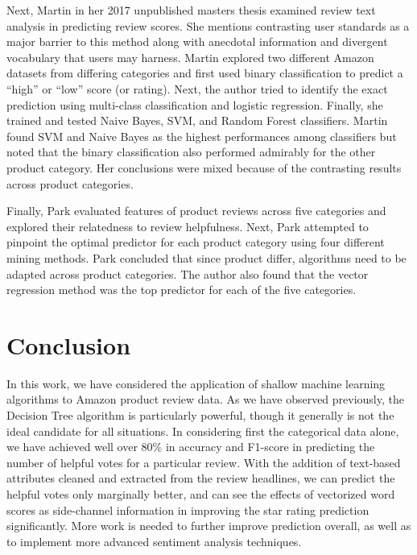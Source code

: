 \documentclass[10pt, conference, compsocconf]{IEEEtran}
\begin{document}
Next, Martin \cite{master} in her 2017 unpublished masters thesis examined review text analysis in predicting review scores. She mentions contrasting user standards as a major barrier to this method along with anecdotal information and divergent vocabulary that users may harness. Martin explored two different Amazon datasets from differing categories and first used binary classification to predict a “high” or “low” score (or rating). Next, the author tried to identify the exact prediction using multi-class classification and logistic regression. Finally, she trained and tested Naive Bayes, SVM, and Random Forest classifiers. Martin found SVM and Naive Bayes as the highest performances among classifiers but noted that the binary classification also performed admirably for the other product category. Her conclusions were mixed because of the contrasting results across product categories.

Finally, Park \cite{Yoon} evaluated features of product reviews across five categories and explored their relatedness to review helpfulness. Next, Park attempted to pinpoint the optimal predictor for each product category using four different mining methods. Park concluded that since product differ, algorithms need to be adapted across product categories. The author also found that the vector regression method was the top predictor for each of the five categories.



\vspace{-0.01cm}
\section{Conclusion}\label{conclusion}
\vspace{-0.01cm}

In this work, we have considered the application of shallow machine learning algorithms to Amazon product review data. As we have observed previously, the Decision Tree algorithm is particularly powerful, though it generally is not the ideal candidate for all situations. In considering first the categorical data alone, we have achieved well over 80\% in accuracy and F1-score in predicting the number of helpful votes for a particular review. With the addition of text-based attributes cleaned and extracted from the review headlines, we can predict the helpful votes only marginally better, and can see the effects of vectorized word scores as side-channel information in improving the star rating prediction significantly. More work is needed to further improve prediction overall, as well as to implement more advanced sentiment analysis techniques.


\vspace{-0.01cm}

\end{document}
